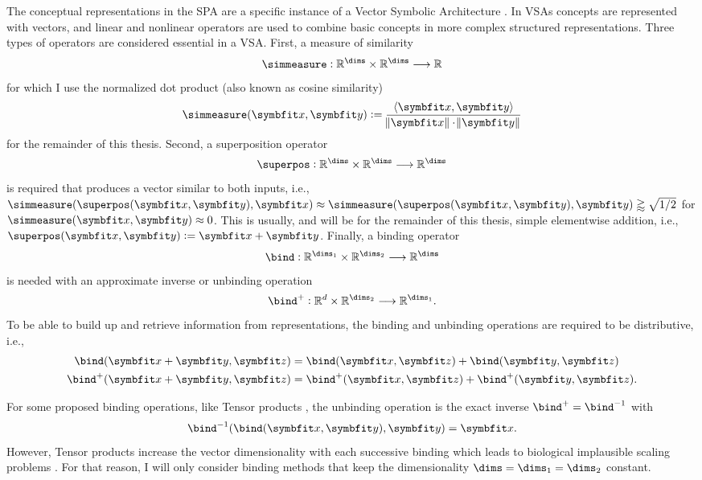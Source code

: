 The conceptual representations in the SPA are a specific instance of a Vector Symbolic Architecture \parencite[VSA;][]{gayler2004}.
In VSAs concepts are represented with vectors, and linear and nonlinear operators are used to combine basic concepts in more complex structured representations.
Three types of operators are considered essential in a VSA\@.
First, a measure of similarity
\begin{equation}
    \simmeasure: \mathbb{R}^{\dims} \times \mathbb{R}^{\dims} \longrightarrow \mathbb{R}
\end{equation}
for which I use the normalized dot product (also known as cosine similarity)
\begin{equation}
    \simmeasure(\vc x, \vc y) := \frac{\left\langle \vc x, \vc y \right\rangle}{\norm{\vc x} \cdot \norm{\vc y}}
\end{equation}
for the remainder of this thesis.
Second, a superposition operator
\begin{equation}
    \superpos: \mathbb{R}^{\dims} \times \mathbb{R}^{\dims} \longrightarrow \mathbb{R}^{\dims}
\end{equation}
is required that produces a vector similar to both inputs, i.e., $\simmeasure(\superpos(\vc x, \vc y), \vc x) \approx \simmeasure(\superpos(\vc x, \vc y), \vc y) \gtrapprox \sqrt{1/2}$ for $\simmeasure(\vc x, \vc y) \approx 0$.
This is usually, and will be for the remainder of this thesis, simple elementwise addition, i.e., $\superpos(\vc x, \vc y) := \vc x + \vc y$.
Finally, a binding operator
\begin{equation}
    \bind: \mathbb{R}^{\dims_1} \times \mathbb{R}^{\dims_2} \longrightarrow \mathbb{R}^{\dims}
\end{equation}
is needed with an approximate inverse or unbinding operation
\begin{equation}
    \bind^+: \mathbb{R}^d \times \mathbb{R}^{\dims_2} \longrightarrow \mathbb{R}^{\dims_1} \text{.}
\end{equation}
To be able to build up and retrieve information from representations, the binding and unbinding operations are required to be distributive, i.e.,
\begin{align}
    \bind(\vc x + \vc y, \vc z) &= \bind(\vc x, \vc z) + \bind(\vc y, \vc z) \\
    \bind^+(\vc x + \vc y, \vc z) &= \bind^+(\vc x, \vc z) + \bind^+(\vc y, \vc z) \text{.}
\end{align}

For some proposed binding operations, like Tensor products \parencite{smolensky1990}, the unbinding operation is the exact inverse $\bind^+ = \bind^{-1}$ with
\begin{equation*}
    \bind^{-1}(\bind(\vc x, \vc y), \vc y) = \vc x \text{.}
\end{equation*}
However, Tensor products increase the vector dimensionality with each successive binding which leads to biological implausible scaling problems \parencite[Appendix D.5]{eliasmith2013}.
For that reason, I will only consider binding methods that keep the dimensionality $\dims = \dims_1 = \dims_2$ constant.

